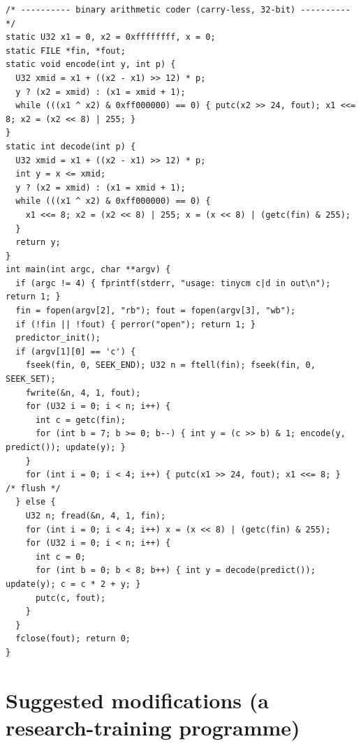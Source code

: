 \documentclass[11pt,a4paper,openany]{book}
\theoremstyle{definition}
\theoremstyle{remark}
\begin{document}
\begin{lstlisting}[style=ccode]
/* ---------- binary arithmetic coder (carry-less, 32-bit) ---------- */
static U32 x1 = 0, x2 = 0xffffffff, x = 0;
static FILE *fin, *fout;
static void encode(int y, int p) {
  U32 xmid = x1 + ((x2 - x1) >> 12) * p;
  y ? (x2 = xmid) : (x1 = xmid + 1);
  while (((x1 ^ x2) & 0xff000000) == 0) { putc(x2 >> 24, fout); x1 <<= 8; x2 = (x2 << 8) | 255; }
}
static int decode(int p) {
  U32 xmid = x1 + ((x2 - x1) >> 12) * p;
  int y = x <= xmid;
  y ? (x2 = xmid) : (x1 = xmid + 1);
  while (((x1 ^ x2) & 0xff000000) == 0) {
    x1 <<= 8; x2 = (x2 << 8) | 255; x = (x << 8) | (getc(fin) & 255);
  }
  return y;
}
int main(int argc, char **argv) {
  if (argc != 4) { fprintf(stderr, "usage: tinycm c|d in out\n"); return 1; }
  fin = fopen(argv[2], "rb"); fout = fopen(argv[3], "wb");
  if (!fin || !fout) { perror("open"); return 1; }
  predictor_init();
  if (argv[1][0] == 'c') {
    fseek(fin, 0, SEEK_END); U32 n = ftell(fin); fseek(fin, 0, SEEK_SET);
    fwrite(&n, 4, 1, fout);
    for (U32 i = 0; i < n; i++) {
      int c = getc(fin);
      for (int b = 7; b >= 0; b--) { int y = (c >> b) & 1; encode(y, predict()); update(y); }
    }
    for (int i = 0; i < 4; i++) { putc(x1 >> 24, fout); x1 <<= 8; }  /* flush */
  } else {
    U32 n; fread(&n, 4, 1, fin);
    for (int i = 0; i < 4; i++) x = (x << 8) | (getc(fin) & 255);
    for (U32 i = 0; i < n; i++) {
      int c = 0;
      for (int b = 0; b < 8; b++) { int y = decode(predict()); update(y); c = c * 2 + y; }
      putc(c, fout);
    }
  }
  fclose(fout); return 0;
}

\end{lstlisting}

\section{Suggested modifications (a research-training programme)}
\end{document}
